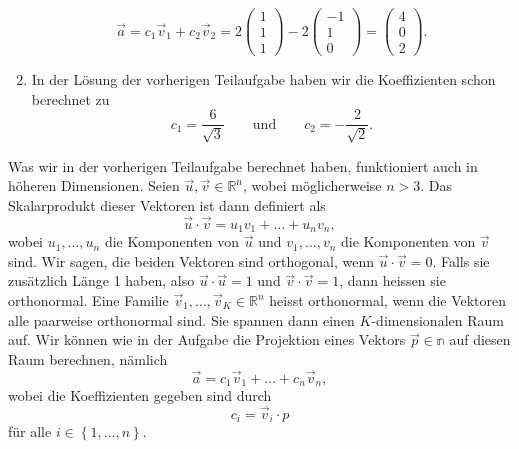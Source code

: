 \begin{losung*}
\begin{enumerate}[label=(\alph*)]
		\begin{equation*}
			\vec a
			=c_1\vec v_1+c_2\vec v_2
			=2\begin{pmatrix}
				1 \\ 1 \\ 1
			\end{pmatrix}
			-2\begin{pmatrix}
				-1 \\ 1 \\ 0
			\end{pmatrix}
			=\begin{pmatrix}
				4 \\ 0 \\ 2
			\end{pmatrix}.
		\end{equation*}
		\item In der Lösung der vorherigen Teilaufgabe haben wir die Koeffizienten schon berechnet zu
		\begin{equation*}
			c_1=\frac{6}{\sqrt{3}}
			\quad\quad\text{und}\quad\quad
			c_2=-\frac{2}{\sqrt{2}}.
		\end{equation*}
	\end{enumerate}
\end{losung*}

Was wir in der vorherigen Teilaufgabe berechnet haben, funktioniert auch in höheren Dimensionen.
Seien $\vec u,\vec v\in\mathbb R^n$, wobei möglicherweise $n>3$.
Das Skalarprodukt dieser Vektoren ist dann definiert als
\begin{equation*}
	\vec u\cdot\vec v=u_1v_1+\ldots+u_nv_n,
\end{equation*}
wobei $u_1,\ldots,u_n$ die Komponenten von $\vec u$ und $v_1,\ldots,v_n$ die Komponenten von $\vec v$ sind.
Wir sagen, die beiden Vektoren sind orthogonal, wenn $\vec u\cdot\vec v=0$.
Falls sie zusätzlich Länge 1 haben, also $\vec u\cdot\vec u=1$ und $\vec v\cdot\vec v=1$, dann heissen sie orthonormal.
Eine Familie $\vec v_1,\ldots,\vec v_K\in\mathbb R^n$ heisst orthonormal, wenn die Vektoren alle paarweise orthonormal sind.
Sie spannen dann einen $K$-dimensionalen Raum auf.
Wir können wie in der Aufgabe die Projektion eines Vektors $\vec p\in\mathbb n$ auf diesen Raum berechnen, nämlich
\begin{equation*}
	\vec a=c_1\vec v_1+\ldots+c_n\vec v_n,
\end{equation*}
wobei die Koeffizienten gegeben sind durch
\begin{equation*}
	c_i=\vec v_i\cdot p
\end{equation*}
für alle $i\in\left\{1,\ldots,n\right\}$.

